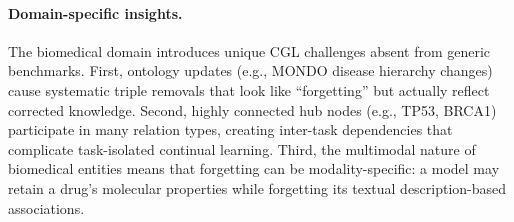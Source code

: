 \paragraph{Domain-specific insights.}
The biomedical domain introduces unique CGL challenges absent from generic benchmarks.
First, ontology updates (e.g., MONDO disease hierarchy changes) cause systematic triple removals that look like ``forgetting'' but actually reflect corrected knowledge.
Second, highly connected hub nodes (e.g., TP53, BRCA1) participate in many relation types, creating inter-task dependencies that complicate task-isolated continual learning.
Third, the multimodal nature of biomedical entities means that forgetting can be modality-specific: a model may retain a drug's molecular properties while forgetting its textual description-based associations.
